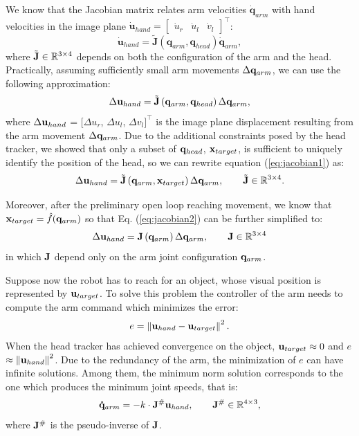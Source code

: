 We know that the Jacobian matrix relates arm velocities $\dot {\mathbf q}_{arm}$
with hand velocities in the image plane $\dot {\mathbf u}_{hand} = \left[ 
\begin{array}{ccc}
  \dot u_r & \dot u_l & \dot v_{l}
\end{array} \right]^\top$:
\begin{equation} 
  \dot {\mathbf u}_{hand}=
  \tilde{\mathbf J}\left(\mathbf q_{arm}, \mathbf q_{head}\right)
  \dot {\mathbf q}_{arm},
\end{equation}
where $\tilde{\mathbf J} \in \mathbb R^{3 \times 4}$ depends on 
both the configuration of the arm and the head. Practically, assuming sufficiently small
arm movements $\Delta \mathbf {q}_{arm}$, we can use the following approximation:
%
\begin{equation} 
\label{eq:jacobian1}
  \Delta \mathbf {u}_{hand}=
  \tilde{\mathbf J}\left(\mathbf q_{arm}, \mathbf q_{head}\right)
  \Delta \mathbf {q}_{arm},
\end{equation}
where $\Delta \mathbf {u}_{hand}$ = $[ \Delta u_r$, $\Delta u_l$, $\Delta v_{l}]^\top$
is the image plane displacement resulting from the arm movement $\Delta \mathbf {q}_{arm}$. Due to the 
additional constraints posed by the head tracker, we showed
that only a subset of $\mathbf{q}_{head}$, $\mathbf{x}_{target}$, is 
sufficient to uniquely identify the position of the head, so we 
can rewrite equation (\ref{eq:jacobian1}) as:
%
\begin{equation}
\label{eq:jacobian2}
  \Delta \mathbf {u}_{hand}=
  \tilde{\mathbf J}\left(\mathbf q_{arm}, \mathbf{x}_{target}\right)
  \Delta \mathbf {q}_{arm}, \qquad \tilde{\mathbf J} \in \mathbb R^{3 \times 4}.
\end{equation}
%

Moreover, after the preliminary open loop reaching movement, we know
that $\mathbf{x}_{target} = \hat f(\mathbf q_{arm})$ so that  Eq.
(\ref{eq:jacobian2}) can be further simplified to:
%
\begin{equation} 
\label{eq:jacobian3}
  \Delta \mathbf {u}_{hand}=
  \mathbf J \left(\mathbf q_{arm}\right)
  \Delta \mathbf {q}_{arm},\qquad \mathbf J \in \mathbb R^{3\times4}
\end{equation}
%
in which $\mathbf J$ depend only on the arm joint configuration $\mathbf q_{arm}$.

Suppose now the robot has to reach for an object, whose visual position is 
represented by $\mathbf{u}_{target}$. To solve this problem 
the controller of the arm needs to compute the arm command which minimizes 
the error:
%
\begin{equation}
  e=\left\|\mathbf{u}_{hand}-\mathbf{u}_{target}\right\|^2.
\end{equation}
%
When the head tracker has achieved convergence on the object, 
$\mathbf{u}_{target} \approx 0 $ and $e$ $\approx \left\|\mathbf{u}_{hand}\right\|^2$.
Due to the redundancy of the arm, the minimization of $e$ can have
infinite solutions. Among them, the minimum norm solution corresponds
to the one which produces the minimum joint speeds, that is:
%
\begin{equation}
\mathbf{\dot q}_{arm}=-k \cdot \mathbf J^\# \mathbf{u}_{hand}, 
\qquad \mathbf J^\# \in \mathbb R^{4 \times 3},
\end{equation}
%
where $\mathbf J^\#$ is the pseudo-inverse of $\mathbf J$.

